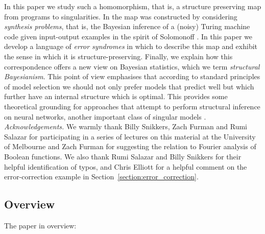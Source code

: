 \documentclass[english,letter paper,12pt,reqno]{article}
\theoremstyle{definition}
\begin{document}
In this paper we study such a homomorphism, that is, a structure preserving map from programs to singularities. In \cite{clift2018derivatives,clift2021geometry,waring2021geometric} the map was constructed by considering \emph{synthesis problems}, that is, the Bayesian inference of a (noisy) Turing machine code given input-output examples in the spirit of Solomonoff \cite{solomonoff1964formal}. In this paper we develop a language of \emph{error syndromes} in which to describe this map and exhibit the sense in which it is structure-preserving. Finally, we explain how this correspondence offers a new view on Bayesian statistics, which we term \emph{structural Bayesianism}. This point of view emphasises that according to standard principles of model selection we should not only prefer models that predict well but which further have an internal structure which is optimal. This provides some theoretical grounding for approaches that attempt to perform structural inference on neural networks, another important class of singular models \cite{hoogland2024developmental,wang2024differentiation}.
\\

\emph{Acknowledgements.} We warmly thank Billy Snikkers, Zach Furman and Rumi Salazar for participating in a series of lectures on this material at the University of Melbourne and Zach Furman for suggesting the relation to Fourier analysis of Boolean functions. We also thank Rumi Salazar and Billy Snikkers for their helpful identification of typos, and Chris Elliott for a helpful comment on the error-correction example in Section~\ref{section:error_correction}.

\subsection{Overview}

The paper in overview:
\end{document}
